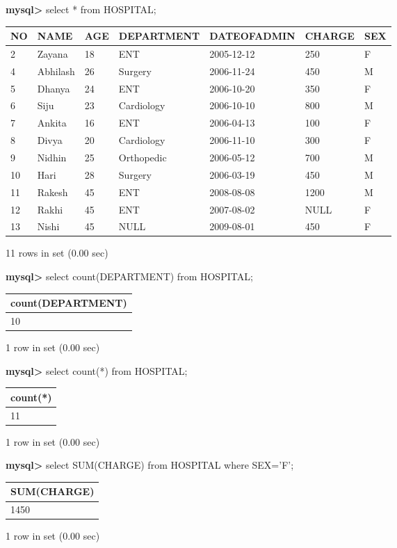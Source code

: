 \documentclass[11pt]{article}
\begin{document}
\textbf{mysql>} select * from HOSPITAL;
\begin{center}
\begin{tabular}{|l|l|l|l|l|l|l|}
\hline
NO & NAME & AGE & DEPARTMENT & DATEOFADMIN & CHARGE & SEX \\
\hline
2 & Zayana & 18 & ENT & 2005-12-12 & 250 & F \\
4 & Abhilash & 26 & Surgery & 2006-11-24 & 450 & M \\
5 & Dhanya & 24 & ENT & 2006-10-20 & 350 & F \\
6 & Siju & 23 & Cardiology & 2006-10-10 & 800 & M \\
7 & Ankita & 16 & ENT & 2006-04-13 & 100 & F \\
8 & Divya & 20 & Cardiology & 2006-11-10 & 300 & F \\
9 & Nidhin & 25 & Orthopedic & 2006-05-12 & 700 & M \\
10 & Hari & 28 & Surgery & 2006-03-19 & 450 & M \\
11 & Rakesh & 45 & ENT & 2008-08-08 & 1200 & M \\
12 & Rakhi & 45 & ENT & 2007-08-02 & NULL & F \\
13 & Nishi & 45 & NULL & 2009-08-01 & 450 & F \\
\hline
\end{tabular}
\end{center}
11 rows in set (0.00 sec)

\textbf{mysql>} select count(DEPARTMENT) from HOSPITAL;
\begin{center}
\begin{tabular}{|l|}
\hline
count(DEPARTMENT) \\
\hline
10 \\
\hline
\end{tabular}
\end{center}
1 row in set (0.00 sec)

\textbf{mysql>} select count(*) from HOSPITAL;
\begin{center}
\begin{tabular}{|l|}
\hline
count(*) \\
\hline
11 \\
\hline
\end{tabular}
\end{center}
1 row in set (0.00 sec)

\textbf{mysql>} select SUM(CHARGE) from HOSPITAL where SEX='F';
\begin{center}
\begin{tabular}{|l|}
\hline
SUM(CHARGE) \\
\hline
1450 \\
\hline
\end{tabular}
\end{center}
1 row in set (0.00 sec)
\end{document}
